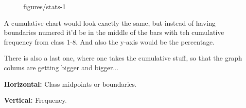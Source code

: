\documentclass{book}
\begin{document}
\begin{figure}[ht]
    \centering
    \caption{figures/stats-1}
    \label{fig:stats-1}
\end{figure}

A cumulative chart would look exactly the same, but instead of having
boundaries numered it'd be in the middle of the bars with teh cumulative
frequency from class 1-8. And also the y-axis would be the percentage.

There is also a last one, where one takes the cumulative stuff, so that the graph colums are getting bigger and bigger...

\textbf{Horizontal:} Class midpoints or boundaries.

\textbf{Vertical:} Frequency.




    
\end{document}
